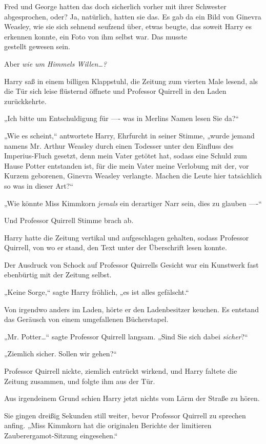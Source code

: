 {Fred und George hatten das doch sicherlich vorher mit ihrer Schwester abgesprochen, oder? Ja, natürlich, hatten sie das. Es gab da ein Bild von Ginevra Weasley, wie sie sich sehnend seufzend über, etwas beugte, das soweit Harry es erkennen konnte, ein Foto von ihm selbst war. Das musste\\ gestellt gewesen sein.

Aber \emph{wie um Himmels Willen…?}

Harry saß in einem billigen Klappstuhl, die Zeitung zum vierten Male lesend, als die Tür sich leise flüsternd öffnete und Professor Quirrell in den Laden zurückkehrte.

„Ich bitte um Entschuldigung für ---- was in Merlins Namen lesen Sie da?“

„Wie es scheint,“ antwortete Harry, Ehrfurcht in seiner Stimme, „wurde jemand namens Mr. Arthur Weasley durch einen Todesser unter den Einfluss des Imperius-Fluch gesetzt, denn mein Vater getötet hat, sodass eine Schuld zum Hause Potter entstanden ist, für die mein Vater meine Verlobung mit der, vor Kurzem geborenen, Ginevra Weasley verlangte. Machen die Leute hier tatsächlich so was in dieser Art?“

„Wie könnte Miss Kimmkorn \emph{jemals} ein derartiger Narr sein, dies zu glauben ----“

Und Professor Quirrell Stimme brach ab.

Harry hatte die Zeitung vertikal und aufgeschlagen gehalten, sodass Professor Quirrell, von wo er stand, den Text unter der Überschrift lesen konnte.

Der Ausdruck von Schock auf Professor Quirrells Gesicht war ein Kunstwerk fast ebenbürtig mit der Zeitung selbst.

„Keine Sorge,“ sagte Harry fröhlich, „es ist alles gefälscht.“

Von irgendwo anders im Laden, hörte er den Ladenbesitzer keuchen. Es entstand das Geräusch von einem umgefallenen Bücherstapel.

„Mr. Potter…“ sagte Professor Quirrell langsam. „Sind Sie sich dabei \emph{sicher}?“

„Ziemlich sicher. Sollen wir gehen?“

Professor Quirrell nickte, ziemlich entrückt wirkend, und Harry faltete die Zeitung zusammen, und folgte ihm aus der Tür.

Aus irgendeinem Grund schien Harry jetzt nichts vom Lärm der Straße zu hören.

Sie gingen dreißig Sekunden still weiter, bevor Professor Quirrell zu sprechen anfing. „Miss Kimmkorn hat die originalen Berichte der limitieren Zauberergamot-Sitzung eingesehen.“

}
